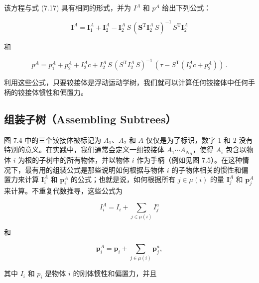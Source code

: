 \documentclass[10pt,a4paper]{book}
\theoremstyle{thmstyle} %
\theoremstyle{defstyle} %
\theoremstyle{prostyle} %
\begin{document}
该方程与式 (7.17) 具有相同的形式，并为 $I^{A}$ 和 $p^{A}$ 给出下列公式：



$$
\boldsymbol{ I } ^{A} = \boldsymbol{ I } _ { 1 } ^{A} + \boldsymbol{ I } _ { 2 } ^{A} - \boldsymbol{ I } _ { 2 } ^{A} \, S \, ( \boldsymbol{ S } ^{\mathrm { T} } \boldsymbol{ I } _ { 2 } ^{A} \, S ) ^{- 1} \, S ^{\mathrm { T} } \boldsymbol{ I } _ { 2 } ^{A}
$$



和



$$
p ^{A} = p _ { 1 } ^{A} + p _ { 2 } ^{A} + I _ { 2 } ^{A} c + I _ { 2 } ^{A} \, S \, ( S ^{\mathrm { T} } I _ { 2 } ^{A} \, S ) ^{- 1} \, ( \tau - S ^{\mathrm { T} } ( I _ { 2 } ^{A} c + p _ { 2 } ^{A} ) ) \, .
$$



利用这些公式，只要铰接体是浮动运动学树，我们就可以计算任何铰接体中任何手柄的铰接体惯性和偏置力。



\subsection{组装子树（Assembling Subtrees）}





图 7.4 中的三个铰接体被标记为 $A_{1}$、$A_{2}$ 和 $A$ 仅仅是为了标识，数字 1 和 2 没有特别的意义。在实践中，我们通常会定义一组铰接体 $A_{1} \cdots A_{N_{B}}$，使得 $A_{i}$ 包含以物体 $i$ 为根的子树中的所有物体，并以物体 $i$ 作为手柄（例如见图 7.5）。在这种情况下，最有用的组装公式是那些说明如何根据与物体 $i$ 的子物体相关的惯性和偏置力来计算 $\boldsymbol{I}_{i}^{A}$ 和 $\boldsymbol{p}_{i}^{A}$ 的公式；也就是说，如何根据所有 $j \in \mu(i)$ 的量 $\boldsymbol{I}_{j}^{A}$ 和 $\boldsymbol{p}_{j}^{A}$ 来计算。不重复代数推导，这些公式为



$$
I _ { i } ^{A} = I _ { i } + \sum _ { j \in \mu ( i ) } I _ { j } ^{a}
$$



和



$$
{ \boldsymbol { p } } _ { i } ^{A} = { \boldsymbol { p } } _ { i } + \sum _ { j \in \mu ( i ) } { \boldsymbol { p } } _ { j } ^{a} ,
$$



其中 $I_{i}$ 和 $p_{i}$ 是物体 $i$ 的刚体惯性和偏置力，并且
\end{document}
